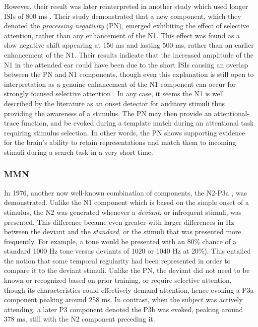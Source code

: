 \documentclass[a4paper,10pt,final]{ThesisStyle}
\begin{document}
However, their result was later reinterpreted in another study which used longer ISIs of 800 ms \cite{Naatanen1978}.  Their study demonstrated that a new component, which they denoted the \textit{processing negativity} (PN), emerged exhibiting the effect of selective attention, rather than any enhancement of the N1.  This effect was found as a slow negative shift appearing at 150 ms and lasting 500 ms, rather than an earlier enhancement of the N1.  Their results indicate that the increased amplitude of the N1 in the attended ear could have been due to the short ISIs causing an overlap between the PN and N1 components, though even this explanation is still open to interpretation as a genuine enhancement of the N1 component can occur for strongly focused selective attention \cite{Naatanen1978,Hillyard1983,Naatanen2011}.  In any case, it seems the N1 is well described by the literature as an onset detector for auditory stimuli thus providing the awareness of a stimulus.  The PN may then provide an attentional-trace function, and be evoked during a template match during an attentional task requiring stimulus selection.  In other words, the PN shows supporting evidence for the brain's ability to retain representations and match them to incoming stimuli during a search task in a very short time.

\subsubsection{MMN}

In 1976, another now well-known combination of components, the N2-P3a \cite{Snyder1976}, was demonstrated.  Unlike the N1 component which is based on the simple onset of a stimulus, the N2 was generated whenever a \textit{deviant}, or infrequent stimuli, was presented.  This difference became even greater with larger differences in Hz between the deviant and the \textit{standard}, or the stimuli that was presented more frequently.  For example, a tone would be presented with an 80\% chance of a standard 1000 Hz tone versus deviants of 1020 or 1040 Hz at 20\%).  This entailed the notion that some temporal regularity had been represented in order to compare it to the deviant stimuli.  Unlike the PN, the deviant did not need to be known or recognized based on prior training, or require selective attention, though its characteristics could effectively demand attention, hence evoking a P3a component peaking around 258 ms.  In contrast, when the subject was actively attending, a later P3 component denoted the P3b was evoked, peaking around 378 ms, still with the N2 component preceding it. 
\end{document}
